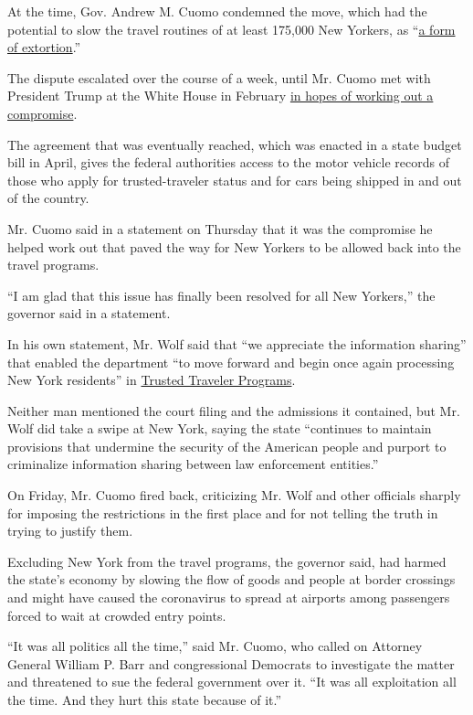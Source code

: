 At the time, Gov. Andrew M. Cuomo condemned the move, which had the
potential to slow the travel routines of at least 175,000 New Yorkers,
as
``\href{https://www.nytimes.com/2020/02/06/nyregion/green-light-law-global-entry.html}{a
form of extortion}.''

The dispute escalated over the course of a week, until Mr. Cuomo met
with President Trump at the White House in February
\href{https://www.nytimes.com/2020/02/12/nyregion/global-entry-cuomo-trump.html}{in
hopes of working out a compromise}.

The agreement that was eventually reached, which was enacted in a state
budget bill in April, gives the federal authorities access to the motor
vehicle records of those who apply for trusted-traveler status and for
cars being shipped in and out of the country.

Mr. Cuomo said in a statement on Thursday that it was the compromise he
helped work out that paved the way for New Yorkers to be allowed back
into the travel programs.

``I am glad that this issue has finally been resolved for all New
Yorkers,'' the governor said in a statement.

In his own statement, Mr. Wolf said that ``we appreciate the information
sharing'' that enabled the department ``to move forward and begin once
again processing New York residents'' in
\href{https://ttp.cbp.dhs.gov/}{Trusted Traveler Programs}.

Neither man mentioned the court filing and the admissions it contained,
but Mr. Wolf did take a swipe at New York, saying the state ``continues
to maintain provisions that undermine the security of the American
people and purport to criminalize information sharing between law
enforcement entities.''

On Friday, Mr. Cuomo fired back, criticizing Mr. Wolf and other
officials sharply for imposing the restrictions in the first place and
for not telling the truth in trying to justify them.

Excluding New York from the travel programs, the governor said, had
harmed the state's economy by slowing the flow of goods and people at
border crossings and might have caused the coronavirus to spread at
airports among passengers forced to wait at crowded entry points.

``It was all politics all the time,'' said Mr. Cuomo, who called on
Attorney General William P. Barr and congressional Democrats to
investigate the matter and threatened to sue the federal government over
it. ``It was all exploitation all the time. And they hurt this state
because of it.''

